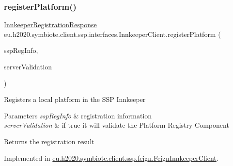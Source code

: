 \subsubsection{\texorpdfstring{register\+Platform()}{registerPlatform()}}
{\footnotesize\ttfamily \hyperlink{classeu_1_1h2020_1_1symbiote_1_1ssp_1_1model_1_1InnkeeperRegistrationResponse}{Innkeeper\+Registration\+Response} eu.\+h2020.\+symbiote.\+client.\+ssp.\+interfaces.\+Innkeeper\+Client.\+register\+Platform (\begin{DoxyParamCaption}\item[{\hyperlink{classeu_1_1h2020_1_1symbiote_1_1cloud_1_1model_1_1ssp_1_1SspRegInfo}{Ssp\+Reg\+Info}}]{ssp\+Reg\+Info,  }\item[{boolean}]{server\+Validation }\end{DoxyParamCaption})}

Registers a local platform in the S\+SP Innkeeper


\begin{DoxyParams}{Parameters}
{\em ssp\+Reg\+Info} & registration information \\
\hline
{\em server\+Validation} & if true it will validate the Platform Registry Component \\
\hline
\end{DoxyParams}
\begin{DoxyReturn}{Returns}
the registration result 
\end{DoxyReturn}


Implemented in \hyperlink{classeu_1_1h2020_1_1symbiote_1_1client_1_1ssp_1_1feign_1_1FeignInnkeeperClient_accc275f13540afa62808f9cd03e94d12}{eu.\+h2020.\+symbiote.\+client.\+ssp.\+feign.\+Feign\+Innkeeper\+Client}.

\mbox{\label{interfaceeu_1_1h2020_1_1symbiote_1_1client_1_1ssp_1_1interfaces_1_1InnkeeperClient_aaa37ea24e8ab9dcb7daa1ab2a7ec0757}} 
